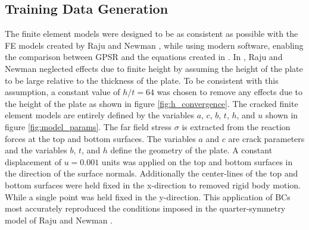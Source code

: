 


\subsection{Training Data Generation}


The finite element models were designed to be as consistent as possible with the FE models created by Raju and Newman \cite{RNeqnsbook}, while using modern software, enabling the comparison between GPSR and the equations created in \cite{RNeqnsbook}. In \cite{RNeqnsbook}, Raju and Newman neglected effects due to finite height by assuming the height of the plate to be large relative to the thickness of the plate. To be consistent with this assumption, a constant value of $h/t = 64$ was chosen to remove any effects due to the height of the plate as shown in figure \ref{fig:h_convergence}. The cracked finite element models are entirely defined by the variables $a$, $c$, $b$, $t$, $h$, and $u$ shown in figure \ref{fig:model_params}. The far field stress $\sigma$ is extracted from the reaction forces at the top and bottom surfaces. The variables $a$ and $c$ are crack parameters and the variables $b$, $t$, and $h$ define the geometry of the plate. A constant displacement of $u = 0.001$ units was applied on the top and bottom surfaces in the direction of the surface normals. Additionally the center-lines of the top and bottom surfaces were held fixed in the x-direction to removed rigid body motion. While a single point was held fixed in the y-direction. This application of BCs most accurately reproduced the conditions imposed in the quarter-symmetry model of Raju and Newman \cite{RNeqnsbook}.

